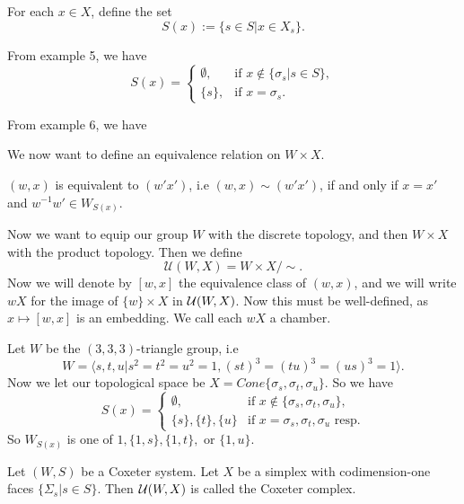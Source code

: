 \documentclass[12pt]{article}
\begin{document}
\begin{definition}
    For each $x\in X$, define the set
    \[S(x):=\{s\in S|x\in X_s\}.\]
\end{definition}

\begin{example}
    From example 5, we have
    \[S(x)=\begin{cases}\emptyset, & \text{if } x\notin \{\sigma_s|s\in S\},\\
        \{s\}, & \text{if } x=\sigma_s.
    \end{cases}\]
\end{example}

\begin{example}
    From example 6, we have
    \[\]
\end{example}

We now want to define an equivalence relation on $W\times X$. 
\begin{definition}
    $(w,x)$ is equivalent to $(w'x')$, i.e $(w,x)\sim (w'x')$, if and only if $x=x'$ and $w^{-1}w'\in W_{S(x)}.$  
\end{definition}

Now we want to equip our group $W$ with the discrete topology, and then $W\times X$ with the product topology. Then we define
\[\mathcal{U}(W,X)=W\times X/\sim.\]
Now we will denote by $[w,x]$ the equivalence class of $(w,x)$, and we will write $wX$ for the image of $\{w\}\times X$ in $\mathcal{U}(W,X)$. Now this must be well-defined, as $x\mapsto [w,x]$ is an embedding. We call each $wX$ a chamber. 

\begin{example}
    Let $W$ be the $(3,3,3)$-triangle group, i.e
    \[W=\langle s,t,u|s^2=t^2=u^2=1,(st)^3=(tu)^3=(us)^3=1\rangle.\]
    Now we let our topological space be $X=Cone\{\sigma_s,\sigma_t,\sigma_u\}$. So we have
    \[S(x)=\begin{cases}
        \emptyset, & \text{if } x\notin \{\sigma_s,\sigma_t,\sigma_u\},\\
        \{s\}, \{t\}, \{u\} & \text{if } x=\sigma_s,\sigma_t,\sigma_u \text{ resp.}
    \end{cases}\]
    So $W_{S(x)}$ is one of $1, \{1,s\},\{1,t\},$ or $\{1,u\}$. 
\end{example}

\begin{definition}
    Let $(W,S)$ be a Coxeter system. Let $X$ be a simplex with codimension-one faces $\{\Sigma_s|s\in S\}$. Then $\mathcal{U}(W,X)$ is called the Coxeter complex.
\end{definition}
\end{document}
